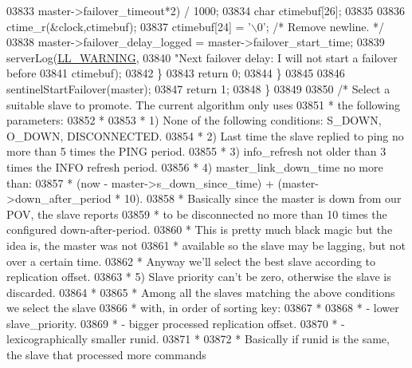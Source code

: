 \begin{DoxyCode}
{{{{{{{{{{{{{{{{{{{{{{{{{{{{{{{{{{{{{{{{{{{{{{{{{{{{{{{{{{{{{{{{{{{{{{{{{{{{{{{{{{{{{{03833                             master->failover\_timeout*2) / 1000;
03834             \textcolor{keywordtype}{char} ctimebuf[26];
03835 
03836             ctime\_r(&clock,ctimebuf);
03837             ctimebuf[24] = \textcolor{stringliteral}{'\(\backslash\)0'}; \textcolor{comment}{/* Remove newline. */}
03838             master->failover\_delay\_logged = master->failover\_start\_time;
03839             serverLog(\hyperlink{server_8h_a31229b9334bba7d6be2a72970967a14b}{LL\_WARNING},
03840                 \textcolor{stringliteral}{"Next failover delay: I will not start a failover before %
03841                 ctimebuf);
03842         \}
03843         \textcolor{keywordflow}{return} 0;
03844     \}
03845 
03846     sentinelStartFailover(master);
03847     \textcolor{keywordflow}{return} 1;
03848 \}
03849 
03850 \textcolor{comment}{/* Select a suitable slave to promote. The current algorithm only uses}
03851 \textcolor{comment}{ * the following parameters:}
03852 \textcolor{comment}{ *}
03853 \textcolor{comment}{ * 1) None of the following conditions: S\_DOWN, O\_DOWN, DISCONNECTED.}
03854 \textcolor{comment}{ * 2) Last time the slave replied to ping no more than 5 times the PING period.}
03855 \textcolor{comment}{ * 3) info\_refresh not older than 3 times the INFO refresh period.}
03856 \textcolor{comment}{ * 4) master\_link\_down\_time no more than:}
03857 \textcolor{comment}{ *     (now - master->s\_down\_since\_time) + (master->down\_after\_period * 10).}
03858 \textcolor{comment}{ *    Basically since the master is down from our POV, the slave reports}
03859 \textcolor{comment}{ *    to be disconnected no more than 10 times the configured down-after-period.}
03860 \textcolor{comment}{ *    This is pretty much black magic but the idea is, the master was not}
03861 \textcolor{comment}{ *    available so the slave may be lagging, but not over a certain time.}
03862 \textcolor{comment}{ *    Anyway we'll select the best slave according to replication offset.}
03863 \textcolor{comment}{ * 5) Slave priority can't be zero, otherwise the slave is discarded.}
03864 \textcolor{comment}{ *}
03865 \textcolor{comment}{ * Among all the slaves matching the above conditions we select the slave}
03866 \textcolor{comment}{ * with, in order of sorting key:}
03867 \textcolor{comment}{ *}
03868 \textcolor{comment}{ * - lower slave\_priority.}
03869 \textcolor{comment}{ * - bigger processed replication offset.}
03870 \textcolor{comment}{ * - lexicographically smaller runid.}
03871 \textcolor{comment}{ *}
03872 \textcolor{comment}{ * Basically if runid is the same, the slave that processed more commands}
}}}}}}}}}}}}}}}}}}}}}}}}}}}}}}}}}}}}}}}}}}}}}}}}}}}}}}}}}}}}}}}}}}}}}}}}}}}}}}}}}}}}}}}
\end{DoxyCode}
